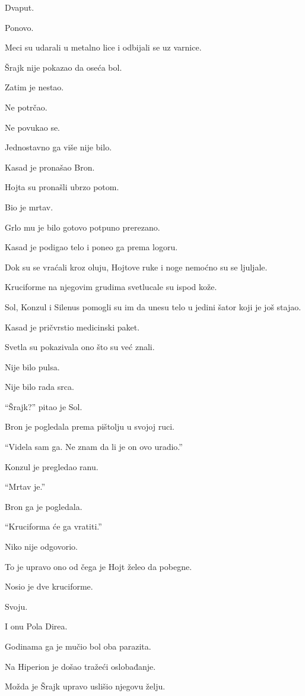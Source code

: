 Dvaput.

Ponovo.

Meci su udarali u metalno lice i odbijali se uz varnice.

Šrajk nije pokazao da oseća bol.

Zatim je nestao.

Ne potrčao.

Ne povukao se.

Jednostavno ga više nije bilo.

\bigskip

Kasad je pronašao Bron.

Hojta su pronašli ubrzo potom.

Bio je mrtav.

Grlo mu je bilo gotovo potpuno prerezano.

Kasad je podigao telo i poneo ga prema logoru.

Dok su se vraćali kroz oluju, Hojtove ruke i noge nemoćno su se ljuljale.

Kruciforme na njegovim grudima svetlucale su ispod kože.

\bigskip

Sol, Konzul i Silenus pomogli su im da unesu telo u jedini šator koji je još stajao.

Kasad je pričvrstio medicinski paket.

Svetla su pokazivala ono što su već znali.

Nije bilo pulsa.

Nije bilo rada srca.

``Šrajk?'' pitao je Sol.

Bron je pogledala prema pištolju u svojoj ruci.

``Videla sam ga. Ne znam da li je on ovo uradio.''

Konzul je pregledao ranu.

``Mrtav je.''

Bron ga je pogledala.

``Kruciforma će ga vratiti.''

Niko nije odgovorio.

To je upravo ono od čega je Hojt želeo da pobegne.

Nosio je dve kruciforme.

Svoju.

I onu Pola Direa.

Godinama ga je mučio bol oba parazita.

Na Hiperion je došao tražeći oslobađanje.

Možda je Šrajk upravo uslišio njegovu želju.

